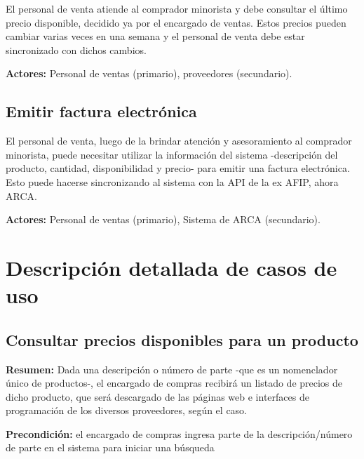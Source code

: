 \documentclass[11pt]{article}
\begin{document}
El personal de venta atiende al comprador minorista y debe consultar el último precio disponible,
decidido ya por el encargado de ventas.
Estos precios pueden cambiar varias veces en una semana y el personal de venta debe estar sincronizado con dichos cambios.

\textbf{Actores:} Personal de ventas (primario), proveedores (secundario).

\subsection{Emitir factura electrónica}

El personal de venta, 
luego de la brindar atención y asesoramiento al comprador minorista,
puede necesitar utilizar la información del sistema
-descripción del producto, cantidad, disponibilidad y precio-
para emitir una factura electrónica.
Esto puede hacerse sincronizando al sistema con la API de la ex AFIP,
ahora ARCA.

\textbf{Actores:} Personal de ventas (primario), Sistema de ARCA (secundario).

\pagebreak

\section{Descripción detallada de casos de uso}

\subsection{Consultar precios disponibles para un producto}

\textbf{Resumen:}
Dada una descripción o número de parte
-que es un nomenclador único de productos-,
el encargado de compras recibirá un listado de precios de dicho producto,
que será descargado de las páginas web e interfaces de programación de los diversos proveedores,
según el caso.

\textbf{Precondición:} 
el encargado de compras ingresa parte de la descripción/número de parte en el sistema para iniciar una búsqueda
\end{document}
